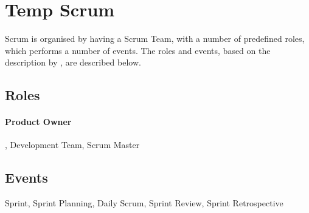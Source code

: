 
\section{Temp Scrum}


Scrum is organised by having a Scrum Team, with a number of predefined roles, which performs a number of events. The roles and events, based on the description by \citet{Schwaber}, are described below.

\subsection{Roles}
\paragraph{Product Owner} , Development Team, Scrum Master

\subsection{Events}
Sprint, Sprint Planning, Daily Scrum, Sprint Review, Sprint Retrospective